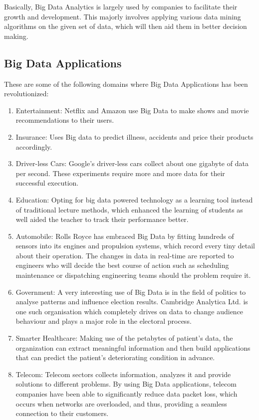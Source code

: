 Basically, Big Data Analytics is largely used by companies to facilitate their growth and development. This majorly involves applying various data mining algorithms on the given set of data, which will then aid them in better decision making.

\subsection{Big Data Applications}

These are some of the following domains where Big Data Applications has been revolutionized:
\begin{enumerate}
    \item Entertainment: Netflix and Amazon use Big Data to make shows and movie recommendations to their users.
    \item Insurance: Uses Big data to predict illness, accidents and price their products accordingly.
    \item Driver-less Cars: Google’s driver-less cars collect about one gigabyte of data per second. These experiments require more and more data for their successful execution.
    \item  Education: Opting for big data powered technology as a learning tool instead of traditional lecture methods, which enhanced the learning of students as well aided the teacher to track their performance better.
    \item Automobile: Rolls Royce has embraced Big Data by fitting hundreds of sensors into its engines and propulsion systems, which record every tiny detail about their operation. The changes in data in real-time are reported to engineers who will decide the best course of action such as scheduling maintenance or dispatching engineering teams should the problem require it.
    \item Government: A very interesting use of Big Data is in the field of politics to analyse patterns and influence election results. Cambridge Analytica Ltd. is one such organisation which completely drives on data to change audience behaviour and plays a major role in the electoral process.
    \item Smarter Healthcare: Making use of the petabytes of patient’s data, the organization can extract meaningful information and then build applications that can predict the patient’s deteriorating condition in advance.
    \item Telecom: Telecom sectors collects information, analyzes it and provide solutions to different problems. By using Big Data applications, telecom companies have been able to significantly reduce data packet loss, which occurs when networks are overloaded, and thus, providing a seamless connection to their customers.

\end{enumerate}

